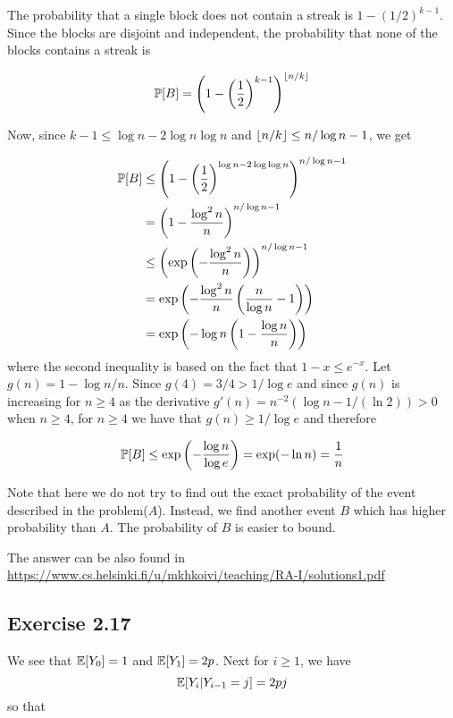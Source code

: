 The probability that a single block does not contain a streak is $1 - (1/2)^{k-1}$. Since the blocks
are disjoint and independent, the probability that none of the blocks contains a streak is

\begin{equation*}
	\P[B] = \left(1 - \left(\frac{1}{2}\right)^{k-1} \right)^{\floor{n/k}}
\end{equation*}

Now, since $k - 1 \leq \log n - 2 \log n \log n$ and $\floor{n/k} \leq n/\log n - 1$, we get

\begin{equation*}
\begin{split}
\P[B] & \leq \left(1 - \left(\frac{1}{2}\right)^{\log n - 2\log \log n}  \right)^{n/\log n - 1} \\
& = \left(1 - \frac{\log^2 n}{n}\right)^{n/\log n - 1} \\
& \leq \left(\exp\left(- \frac{\log^2 n}{n}\right)\right)^{n/\log n - 1} \\
& = \exp\left(-\frac{\log^2 n}{n}\left(\frac{n}{\log n} - 1 \right)\right) \\
& = \exp\left(-\log n \left(1 - \frac{\log n}{n}\right)\right)
\end{split}
\end{equation*}
where the second inequality is based on the fact that $1 - x \leq e^{-x}$. Let $g(n) = 1 - \log n/n$.
Since $g(4) = 3/4 > 1/\log e$ and since $g(n)$ is increasing for $n \geq 4$ as the derivative $g'(n) = 
n^{-2}(\log n - 1/(\ln 2)) > 0$ when $n \geq 4$, for $n \geq 4$ we have that $g(n) \geq 1/\log e$ and 
therefore

\begin{equation*}
	\P[B] \leq \exp \left( - \frac{\log n}{\log e} \right) = \exp(-\ln n) = \frac{1}{n}
\end{equation*}

Note that here we do not try to find out the exact probability of the event described in the problem($A$).
Instead, we find another event $B$ which has higher probability than $A$. The probability of $B$ is 
easier to bound.  

The answer can be also found in \url{https://www.cs.helsinki.fi/u/mkhkoivi/teaching/RA-I/solutions1.pdf}

\subsection*{Exercise 2.17}

We see that $\E[Y_0] = 1$ and $\E[Y_1] = 2p$. Next for $i \geq 1$, we have
\begin{equation*}
	\E[Y_i | Y_{i-1} = j] = 2pj
\end{equation*}
so that

